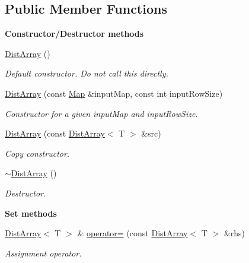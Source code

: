 \subsection*{Public Member Functions}
\begin{Indent}{\bf Constructor/\-Destructor methods}\par
\begin{DoxyCompactItemize}
\item 
\hyperlink{class_q_u_e_s_o_1_1_dist_array_a54e6413babda861c8bf5213888c9b9f0}{Dist\-Array} ()
\begin{DoxyCompactList}\small\item\em Default constructor. Do not call this directly. \end{DoxyCompactList}\item 
\hyperlink{class_q_u_e_s_o_1_1_dist_array_a408055a81ec9f83f4eb9b71f1951451c}{Dist\-Array} (const \hyperlink{class_q_u_e_s_o_1_1_map}{Map} \&input\-Map, const int input\-Row\-Size)
\begin{DoxyCompactList}\small\item\em Constructor for a given input\-Map and input\-Row\-Size. \end{DoxyCompactList}\item 
\hyperlink{class_q_u_e_s_o_1_1_dist_array_a0e4de6b524fed444be71ee26349a907b}{Dist\-Array} (const \hyperlink{class_q_u_e_s_o_1_1_dist_array}{Dist\-Array}$<$ T $>$ \&src)
\begin{DoxyCompactList}\small\item\em Copy constructor. \end{DoxyCompactList}\item 
\hyperlink{class_q_u_e_s_o_1_1_dist_array_a8091b856529984e5c307e37e5438bfa4}{$\sim$\-Dist\-Array} ()
\begin{DoxyCompactList}\small\item\em Destructor. \end{DoxyCompactList}\end{DoxyCompactItemize}
\end{Indent}
\begin{Indent}{\bf Set methods}\par
\begin{DoxyCompactItemize}
\item 
\hyperlink{class_q_u_e_s_o_1_1_dist_array}{Dist\-Array}$<$ T $>$ \& \hyperlink{class_q_u_e_s_o_1_1_dist_array_a6ec9bfcdf00351c8fb9b18dfeab59026}{operator=} (const \hyperlink{class_q_u_e_s_o_1_1_dist_array}{Dist\-Array}$<$ T $>$ \&rhs)
\begin{DoxyCompactList}\small\item\em Assignment operator. \end{DoxyCompactList}\end{DoxyCompactItemize}
\end{Indent}
